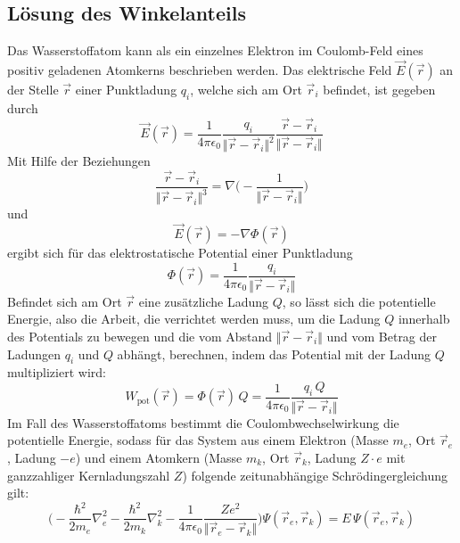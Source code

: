 \documentclass[9pt]{report}
\begin{document}
\subsection{Lösung des Winkelanteils}
Das Wasserstoffatom kann als ein einzelnes Elektron im Coulomb-Feld eines positiv geladenen Atomkerns beschrieben werden. Das elektrische Feld $\vec{E}(\vec{r})$ an der Stelle $\vec{r}$ einer Punktladung $q_i$, welche sich am Ort $\vec{r}_i$ befindet, ist gegeben durch
\begin{equation}
\vec{E}(\vec{r})=\frac{1}{4\pi\epsilon_0}\frac{q_i}{\Vert\vec{r}-\vec{r}_i\Vert^2}\frac{\vec{r}-\vec{r}_i}{\Vert\vec{r}-\vec{r}_i\Vert}
\end{equation}
Mit Hilfe der Beziehungen
\begin{equation}
\frac{\vec{r}-\vec{r}_i}{\Vert\vec{r}-\vec{r}_i\Vert^3}=\nabla\bigg(-\frac{1}{\Vert\vec{r}-\vec{r}_i\Vert}\bigg)
\end{equation}
und
\begin{equation}
\vec{E}(\vec{r})=-\nabla\Phi(\vec{r})
\end{equation}
ergibt sich für das elektrostatische Potential einer Punktladung
\begin{equation}
\Phi(\vec{r})=\frac{1}{4\pi\epsilon_0}\frac{q_i}{\Vert\vec{r}-\vec{r}_i\Vert}
\end{equation}
Befindet sich am Ort $\vec{r}$ eine zusätzliche Ladung $Q$, so lässt sich die potentielle Energie, also die Arbeit, die verrichtet werden muss, um die Ladung $Q$ innerhalb des Potentials zu bewegen und die vom Abstand $\Vert\vec{r}-\vec{r}_i\Vert$ und vom Betrag der Ladungen $q_i$ und $Q$ abhängt, berechnen, indem das Potential mit der Ladung $Q$ multipliziert wird:
\begin{equation}
W_{\mathrm{pot}}(\vec{r})=\Phi(\vec{r})\,Q=\frac{1}{4\pi\epsilon_0}\frac{q_i\,Q}{\Vert\vec{r}-\vec{r}_i\Vert}
\end{equation}
Im Fall des Wasserstoffatoms bestimmt die Coulombwechselwirkung die potentielle Energie, sodass für das System aus einem Elektron (Masse $m_e$, Ort $\vec{r}_e$, Ladung $-e$) und einem Atomkern (Masse $m_k$, Ort $\vec{r}_k$, Ladung $Z\cdot e$ mit ganzzahliger Kernladungszahl $Z$) folgende zeitunabhängige Schrödingergleichung gilt:
\begin{equation}
\bigg(-\frac{\hbar^2}{2m_e}\nabla^{2}_{e}-\frac{\hbar^2}{2m_k}\nabla^{2}_{k}-\frac{1}{4\pi\epsilon_0}\frac{Ze^2}{\Vert\vec{r}_e-\vec{r}_k\Vert}\bigg)\Psi(\vec{r}_e,\vec{r}_k)=E\,\Psi(\vec{r}_e,\vec{r}_k)
\end{equation}
\end{document}
